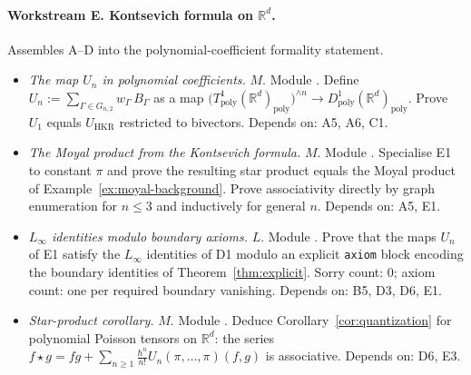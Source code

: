 \documentclass[11pt,a4paper]{article}
\theoremstyle{definition}
\newcommand{\R}{\mathbb{R}}
\newcommand{\Tpoly}{T_{\mathrm{poly}}}
\newcommand{\Dpoly}{D_{\mathrm{poly}}}
\newcommand{\defi}[1]{\emph{#1}}
\begin{document}
\paragraph{Workstream E. Kontsevich formula on $\R^{d}$.}
Assembles A--D into the polynomial-coefficient formality statement.
\begin{itemize}[leftmargin=2em]
  \item[\textbf{E1}]
    \defi{The map $U_{n}$ in polynomial coefficients.} $M$. Module
    . Define
    $U_{n} := \sum_{\Gamma \in G_{n,2}} w_{\Gamma}\, B_{\Gamma}$
    as a map
    $\bigl(\Tpoly^{1}(\R^{d})_{\mathrm{poly}}\bigr)^{\wedge n}
    \to \Dpoly^{1}(\R^{d})_{\mathrm{poly}}$. Prove $U_{1}$ equals
    $U_{\mathrm{HKR}}$ restricted to bivectors. Depends on: A5, A6,
    C1.
  \item[\textbf{E2}]
    \defi{The Moyal product from the Kontsevich formula.} $M$.
    Module . Specialise E1 to
    constant $\pi$ and prove the resulting star product equals the
    Moyal product of Example~\ref{ex:moyal-background}. Prove
    associativity directly by graph enumeration for $n \le 3$ and
    inductively for general $n$. Depends on: A5, E1.
  \item[\textbf{E3}]
    \defi{$L_\infty$ identities modulo boundary axioms.} $L$.
    Module . Prove that the maps
    $U_{n}$ of E1 satisfy the $L_\infty$ identities of D1 modulo an
    explicit \texttt{axiom} block encoding the boundary identities
    of Theorem~\ref{thm:explicit}. Sorry count: $0$; axiom count:
    one per required boundary vanishing. Depends on: B5, D3, D6, E1.
  \item[\textbf{E4}]
    \defi{Star-product corollary.} $M$. Module
    . Deduce
    Corollary~\ref{cor:quantization} for polynomial Poisson tensors
    on $\R^{d}$: the series
    $f\star g = fg + \sum_{n\ge 1} \tfrac{\hbar^{n}}{n!}
    U_{n}(\pi,\dots,\pi)(f,g)$ is associative. Depends on: D6, E3.
\end{itemize}
\end{document}
